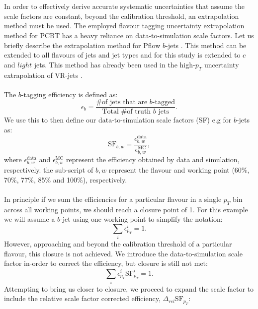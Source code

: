 \\
\\
In order to effectively derive accurate systematic uncertainties that assume the scale factors are constant, beyond the calibration threshold, an extrapolation method must be used. The employed flavour tagging uncertainty extrapolation method for PCBT has a heavy reliance on data-to-simulation scale factors. Let us briefly describe the extrapolation method for Pflow $b$-jets \cite{ATL-PHYS-PUB-2021-003}. This method can be extended to all flavours of jets and jet types and for this study is extended to $c$ and $light$ jets. This method has already been used in the high-$p_T$ uncertainty extrapolation of VR-jets \cite{Ke:2023G/}.
\\
\\
The $b$-tagging efficiency is defined as:
\begin{equation*}
    \epsilon_{b}= \frac{\# \text{of jets that are $b$-tagged} }{\text{Total \# of truth $b$ jets}}.
\end{equation*}
We use this to then define our data-to-simulation scale factors (SF) e.g for $b$-jets as:
\begin{equation*}
    \text{SF}_{b,w}= \frac{\epsilon^{\text{data}}_{b,w}}{\epsilon^{\text{MC}}_{b,w}},
\end{equation*}
where $\epsilon^{\text{data}}_{b,w}$ and $\epsilon^{\text{MC}}_{b,w}$ represent the efficiency obtained by data and simulation, respectively. the sub-script of $b,w$ represent the flavour and working point (60\%, 70\%, 77\%, 85\% and 100\%), respectively. 
\\
\\
In principle if we sum the efficiencies for a particular flavour in a single $p_T$ bin across all working points, we should reach a closure point of 1. For this example we will assume a $b$-jet using one working point to simplify the notation:
\begin{equation*}
    \sum_{i} \epsilon^{i}_{p_T} = 1.
\end{equation*}
However, approaching and beyond the calibration threshold of a particular flavour, this closure is not achieved. We introduce the data-to-simulation scale factor in-order to correct the efficiency, but closure is still not met:
\begin{equation*}
    \sum_{i} \epsilon^{i}_{p_T} \text{SF}^{i}_{p_T} = 1.
\end{equation*}
Attempting to bring us closer to closure, we proceed to expand the scale factor to include the relative scale factor corrected efficiency, $\Delta_{rel} \text{SF}_{p_T}$:
